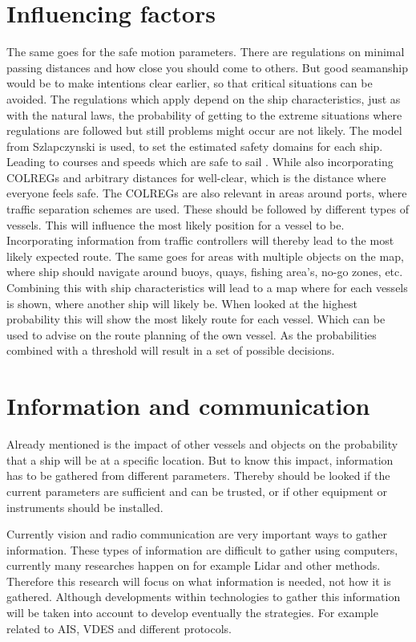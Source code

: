 \section{Influencing factors}
The same goes for the safe motion parameters. There are regulations on minimal passing distances and how close you should come to others. But good seamanship would be to make intentions clear earlier, so that critical situations can be avoided. The regulations which apply depend on the ship characteristics, just as with the natural laws, the probability of getting to the extreme situations where regulations are followed but still problems might occur are not likely.
The model from Szlapczynski is used, to set the estimated safety domains for each ship. Leading to courses and speeds which are safe to sail \cite{Szlapczynski2017}. While also incorporating \ac{COLREGs} and arbitrary distances for well-clear, which is the distance where everyone feels safe.
The \ac{COLREGs} are also relevant in areas around ports, where traffic separation schemes are used. These should be followed by different types of vessels. This will influence the most likely position for a vessel to be. Incorporating information from traffic controllers will thereby lead to the most likely expected route. The same goes for areas with multiple objects on the map, where ship should navigate around buoys, quays, fishing area's, no-go zones, etc.
Combining this with ship characteristics will lead to a map where for each vessels is shown, where another ship will likely be. When looked at the highest probability this will show the most likely route for each vessel. Which can be used to advise on the route planning of the own vessel. As the probabilities combined with a threshold will result in a set of possible decisions.

\section{Information and communication}
Already mentioned is the impact of other vessels and objects on the probability that a ship will be at a specific location. But to know this impact, information has to be gathered from different parameters. Thereby should be looked if the current parameters are sufficient and can be trusted, or if other equipment or instruments should be installed.

Currently vision and radio communication are very important ways to gather information. These types of information are difficult to gather using computers, currently many researches happen on for example Lidar and other methods. Therefore this research will focus on what information is needed, not how it is gathered. Although developments within technologies to gather this information will be taken into account to develop eventually the strategies. For example related to \ac{AIS}, \ac{VDES} and different protocols.

